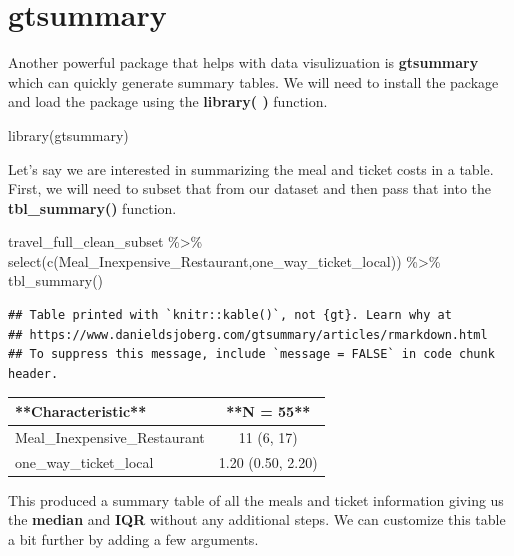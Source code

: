 \documentclass[
]{book}
\newenvironment{Shaded}{\begin{snugshade}}{\end{snugshade}}
\newcommand{\FunctionTok}[1]{\textcolor[rgb]{0.00,0.00,0.00}{#1}}
\newcommand{\NormalTok}[1]{#1}
\newcommand{\SpecialCharTok}[1]{\textcolor[rgb]{0.00,0.00,0.00}{#1}}
\begin{document}
\hypertarget{gtsummary}{%
\section{gtsummary}\label{gtsummary}}

Another powerful package that helps with data visulizuation is \textbf{gtsummary} which can quickly generate summary tables. We will need to install the package and load the package using the \textbf{library( )} function.

\begin{Shaded}
\begin{Highlighting}[]
\FunctionTok{library}\NormalTok{(gtsummary)}
\end{Highlighting}
\end{Shaded}

Let's say we are interested in summarizing the meal and ticket costs in a table. First, we will need to subset that from our dataset and then pass that into the \textbf{tbl\_summary()} function.

\begin{Shaded}
\begin{Highlighting}[]
\NormalTok{travel\_full\_clean\_subset }\SpecialCharTok{\%\textgreater{}\%}
  \FunctionTok{select}\NormalTok{(}\FunctionTok{c}\NormalTok{(Meal\_Inexpensive\_Restaurant,one\_way\_ticket\_local)) }\SpecialCharTok{\%\textgreater{}\%}
  \FunctionTok{tbl\_summary}\NormalTok{()}
\end{Highlighting}
\end{Shaded}

\begin{verbatim}
## Table printed with `knitr::kable()`, not {gt}. Learn why at
## https://www.danieldsjoberg.com/gtsummary/articles/rmarkdown.html
## To suppress this message, include `message = FALSE` in code chunk header.
\end{verbatim}

\begin{tabular}{l|c}
\hline
**Characteristic** & **N = 55**\\
\hline
Meal\_Inexpensive\_Restaurant & 11 (6, 17)\\
\hline
one\_way\_ticket\_local & 1.20 (0.50, 2.20)\\
\hline
\end{tabular}

This produced a summary table of all the meals and ticket information giving us the \textbf{median} and \textbf{IQR} without any additional steps. We can customize this table a bit further by adding a few arguments.
\end{document}
